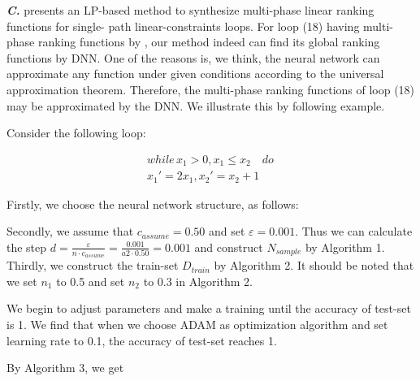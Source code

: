 \textbf{\emph{C.}} \cite{ben2017multiphase} presents an LP-based method to synthesize multi-phase linear ranking functions for single- path linear-constraints loops. For loop (18) having multi-phase ranking functions by \cite{ben2017multiphase}, our method indeed can find its global ranking functions by DNN. One of the reasons is, we think, the neural network can approximate any function under given conditions according to the universal approximation theorem. Therefore, the multi-phase ranking functions of loop (18) may be approximated by the DNN. We illustrate this by following example.
\begin{exam}\label{exm7}
	Consider the following loop:
	
	$$\begin{array}{l}
	while\,{x_1} > 0,{x_1} \le {x_2}\quad do\,\\
	{{x_1}'} = 2{x_1},{{x_2}'} = {x_2} + 1
	\end{array}$$
	
	Firstly, we choose the neural network structure, as follows:
	\begin{figure}[H] 
		\caption{}
		\label{neural structure for 3 neurons}
	\end{figure}
	Secondly, we assume that ${c_{assume}} = 0.50$ and set $\varepsilon  = 0.001$. Thus we can calculate the step $d = \frac{\varepsilon }{{n\cdot{c_{assume}}}} = \frac{{0.001}}{{a2\cdot0.50}} = 0.001$ and construct $N_{sample}$ by Algorithm 1. Thirdly, we construct the train-set $D_{train}$ by Algorithm 2. It should be noted that we set ${n_1}$ to 0.5 and set ${n_2}$ to 0.3 in Algorithm 2.
	
	We begin to adjust parameters and make a training until the accuracy of test-set is 1. We find that when we choose ADAM as optimization algorithm and set learning rate to 0.1, the accuracy of test-set reaches 1.
	
	By Algorithm 3, we get
	

\end{exam}

